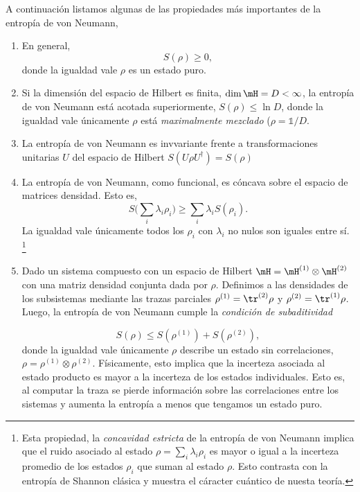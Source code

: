 A continuación listamos algunas de las propiedades más importantes de la entropía de von Neumann,
 
 \begin{enumerate}
     \item En general,
     $$
     S(\rho) \geq 0,
     $$
     donde la igualdad vale \sii $\rho$ es un estado puro.
     \item 
     Si la dimensión del espacio de Hilbert es finita, $\dim \mH = D < \infty$, la entropía de von Neumann está acotada superiormente, $S(\rho) \leq \ln D$, donde la igualdad vale únicamente \sii $\rho$ está \textit{maximalmente mezclado} ($\rho = \mathds{1}/D$.
     \item La entropía de von Neumann es invvariante frente a  transformaciones unitarias $U$ del espacio de Hilbert \ie $S(U\rho U^{\dagger}) = S(\rho)$
     \item La entropía de von Neumann, como funcional, es cóncava sobre el espacio de matrices densidad. Esto es,
     $$
     S \bigg(\sum_{i} \lambda_i \rho_i\bigg) \geq \sum_{i} \lambda_i S(\rho_i).
     $$
     La igualdad vale únicamente \sii todos los $\rho_i$ con $\lambda_i$ no nulos son iguales entre sí. \footnote{Esta propiedad, la \textit{concavidad estricta} de la entropía de von Neumann implica que el ruido asociado al estado $\rho = \sum_i \lambda_i \rho_i$ es mayor o igual a la incerteza promedio de los estados $\rho_i$ que suman al estado $\rho$. Esto contrasta con la entropía de Shannon clásica y muestra el cáracter cuántico de nuesta teoría.}
     \item Dado un sistema compuesto con un espacio de Hilbert $\mH = \mH ^{(1)} \otimes \mH ^{(2)}$ con una matriz densidad conjunta dada por $\rho$. Definimos a las densidades de los subsistemas mediante las trazas parciales $\rho^{(1)}=\tr^{(2)} \rho$ y $\rho^{(2)}=\tr^{(1)} \rho$. Luego, la entropía de von Neumann cumple la \textit{condición de subaditividad}
     
     $$
     S(\rho) \leq S(\rho^{(1)}) + S(\rho^{(2)}),
     $$
     donde la igualdad vale únicamente \sii $\rho$ describe un estado sin correlaciones, $\rho = \rho^{(1)} \otimes \rho^{(2)}$. Físicamente, esto implica que la incerteza asociada al estado producto es mayor a la incerteza de los estados individuales. Esto es, al computar la traza se pierde información sobre las correlaciones entre los sistemas y aumenta la entropía a menos que tengamos un estado puro. 
     \end{enumerate}
 
